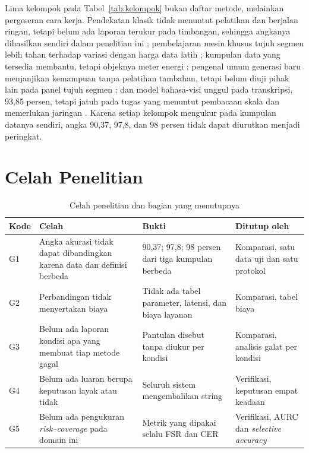 \documentclass[12pt,a4paper,oneside]{report}
\newcommand{\parencite}[1]{\citep{#1}}
\begin{document}
Lima kelompok pada Tabel~\ref{tab:kelompok} bukan daftar metode, melainkan
pergeseran cara kerja. Pendekatan klasik tidak menuntut pelatihan dan berjalan
ringan, tetapi belum ada laporan terukur pada timbangan, sehingga angkanya
dihasilkan sendiri dalam penelitian ini \parencite{auerswal_ssocr};
pembelajaran mesin khusus tujuh
segmen lebih tahan terhadap variasi dengan harga data latih
\parencite{effendi2025unjuk}; kumpulan data yang tersedia membantu, tetapi objeknya
meter energi \parencite{laroca2019convolutional}; pengenal umum generasi baru
menjanjikan kemampuan tanpa pelatihan tambahan, tetapi belum diuji pihak lain pada
panel tujuh segmen \parencite{zhang2026ppocrv6}; dan model bahasa-visi unggul pada
transkripsi, 93,85 persen, tetapi jatuh pada tugas yang menuntut pembacaan skala dan
memerlukan jaringan \parencite{ega2026leveraging, lin2026measurebench}. Karena
setiap kelompok mengukur pada kumpulan datanya sendiri, angka 90,37, 97,8, dan 98
persen tidak dapat diurutkan menjadi peringkat.

\section{Celah Penelitian}

\begin{table}[H]
\caption{Celah penelitian dan bagian yang menutupnya}
\label{tab:celah}
\begin{tabularx}{\textwidth}{@{}L{1.0cm} L{5.4cm} L{4.2cm} X@{}}
\toprule
\textbf{Kode} & \textbf{Celah} & \textbf{Bukti} & \textbf{Ditutup oleh} \\
\midrule
G1 & Angka akurasi tidak dapat dibandingkan karena data dan definisi berbeda & 90,37; 97,8; 98 persen dari tiga kumpulan berbeda & Komparasi, satu data uji dan satu protokol \\
G2 & Perbandingan tidak menyertakan biaya & Tidak ada tabel parameter, latensi, dan biaya layanan & Komparasi, tabel biaya \\
G3 & Belum ada laporan kondisi apa yang membuat tiap metode gagal & Pantulan disebut tanpa diukur per kondisi \parencite{low2024detecting} & Komparasi, analisis galat per kondisi \\
G4 & Belum ada luaran berupa keputusan layak atau tidak & Seluruh sistem mengembalikan string & Verifikasi, keputusan empat keadaan \\
G5 & Belum ada pengukuran \textit{risk--coverage} pada domain ini & Metrik yang dipakai selalu FSR dan CER & Verifikasi, AURC dan \textit{selective accuracy} \\
\bottomrule
\end{tabularx}
\end{table}
\end{document}
